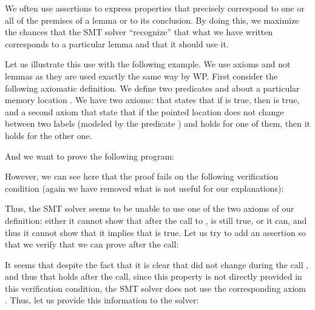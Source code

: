 

We often use assertions to express properties that precisely correspond to one
or all of the premises of a lemma or to its conclusion. By doing this, we
maximize the chances that the SMT solver ``recognize'' that what we have written
corresponds to a particular lemma and that it should use it.



Let us illustrate this use with the following example. We use axioms and not
lemmas as they are used exactly the same way by WP. First consider the following
axiomatic definition. We define  two predicates  and
 about a particular memory location . We have two
axioms:  that states that if  is true, then
 is true, and a second axiom  that state that
if the pointed location does not change between two labels (modeled by the
predicate ) and  holds for one of them, then it
holds for the other one.





And we want to prove the following program:




However, we can see here that the proof fails on the following verification
condition (again we have removed what is not useful for our explanations):




Thus, the SMT solver seems to be unable to use one of the two axioms of our
definition: either it cannot show that after the call to ,
 is still true, or it can, and thus it cannot show that it
implies that  is true. Let us try to add an assertion so that
we verify that we can prove  after the call:








It seems that despite the fact that it is clear that  did not
change during the call , and thus that
 holds after the call, since this property is
not directly provided in this verification condition, the SMT solver does not
use the corresponding axiom . Thus, let us provide this
information to the solver:


